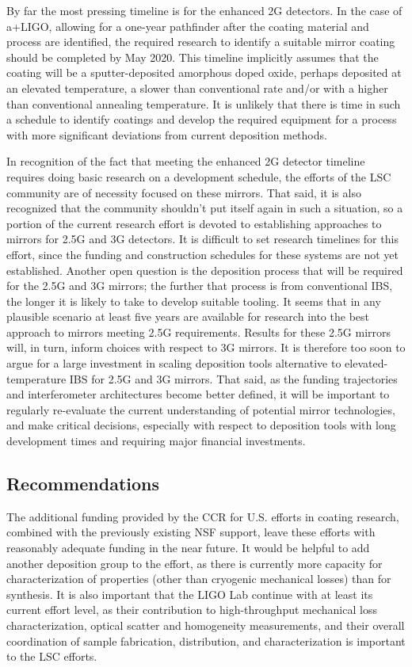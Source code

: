 By far the most pressing timeline is for the enhanced 2G detectors. In the case of a+LIGO, allowing for a one-year pathfinder after the coating material and process are identified, the required research to identify a suitable mirror coating should be completed by May 2020. This timeline implicitly assumes that the coating will be a sputter-deposited amorphous doped oxide, perhaps deposited at an elevated temperature, a slower than conventional rate and/or with a higher than conventional annealing temperature. It is unlikely that there is time in such a schedule to identify coatings and develop the required equipment for a process with more significant deviations from current deposition methods.

In recognition of the fact that meeting the enhanced 2G detector timeline requires doing basic research on a development schedule, the efforts of the LSC community are of necessity focused on these mirrors. That said, it is also recognized that the community shouldn't put itself again in such a situation, so a portion of the current research effort is devoted to establishing approaches to mirrors for 2.5G and 3G detectors. It is difficult to set research timelines for this effort, since the funding and construction schedules for these systems are not yet established. Another open question is the deposition process that will be required for the 2.5G and 3G mirrors; the further that process is from conventional IBS, the longer it is likely to take to develop suitable tooling. It seems that in any plausible scenario at least five years are available for research into the best approach to mirrors meeting 2.5G requirements. Results for these 2.5G mirrors will, in turn, inform choices with respect to 3G mirrors. It is therefore too soon to argue for a large investment in scaling deposition tools alternative to elevated-temperature IBS for 2.5G and 3G mirrors. That said, as the funding trajectories and interferometer architectures become better defined, it will be important to regularly re-evaluate the current understanding of potential mirror technologies, and make critical decisions, especially with respect to deposition tools with long development times and requiring major financial investments.

\subsection{Recommendations}

\noindent The additional funding provided by the CCR for U.S. efforts in coating research, combined with the previously existing NSF support, leave these efforts with reasonably adequate funding in the near future. It would be helpful to add another deposition group to the effort, as there is currently more capacity for characterization of properties (other than cryogenic mechanical losses) than for synthesis. It is also important that the LIGO Lab continue with at least its current effort level, as their contribution to high-throughput mechanical loss characterization, optical scatter and homogeneity measurements, and their overall coordination of sample fabrication, distribution, and characterization is important to the LSC efforts.

